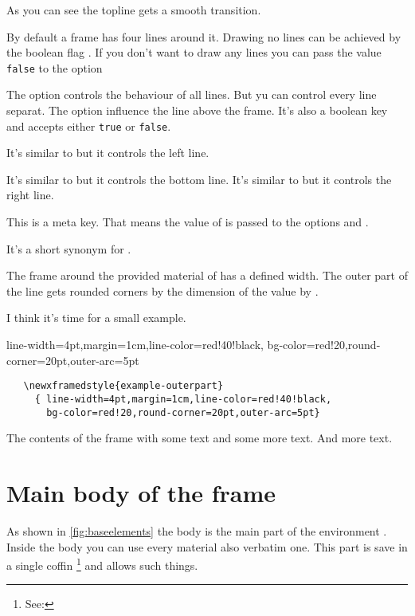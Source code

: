 \documentclass[openany,12pt,tocdepth=3]{ltx-md}
\begin{document}
As you can see the topline gets a smooth transition. 

By default a frame has four lines around it. Drawing no
lines can be achieved by the boolean flag .
If you don't want to draw any lines you can pass the value \texttt{false}
to the option 

The option  controls the behaviour
of all lines. But yu can control every line separat. The option 
 influence the line above the frame. It's also 
a boolean key and accepts either \texttt{true} or \texttt{false}.

It's similar to  but it controls the left line.

It's similar to  but it controls the bottom line.
It's similar to  but it controls the right line.

This is a meta key. That means the value of  is passed
to the options  and .

It's a short synonym for .

The frame around the provided material of  
has a defined width. The outer part of the line gets
rounded corners by the dimension of the value by .

I think it's time for a small example.

\begin{ltxexample}[caption=Example outer part III,result=true,]
   { line-width=4pt,margin=1cm,line-color=red!40!black,
     bg-color=red!20,round-corner=20pt,outer-arc=5pt}
\begin{xframed}[style=example-outerpart]
 \begin{verbatim}
   \newxframedstyle{example-outerpart}
     { line-width=4pt,margin=1cm,line-color=red!40!black,
       bg-color=red!20,round-corner=20pt,outer-arc=5pt}
 \end{verbatim}
 The contents of the frame with some text
 and some more text. And more text.
\end{xframed}
\end{ltxexample}

\section{Main body of the frame}\label{sec:element-main}
As shown in \autoref{fig:baseelements} the body is the main part of
the environment . Inside the body you can use every
material also verbatim one. This part is save in a single coffin%
\footnote{See: }  and allows such things. 
\end{document}
